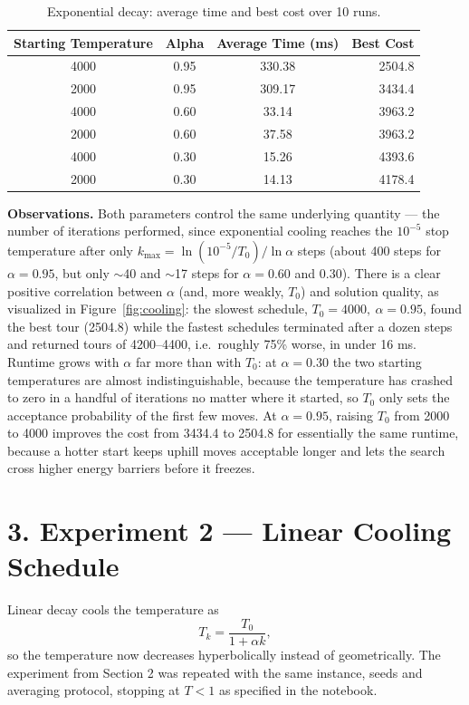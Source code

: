 \documentclass[11pt]{article}
\begin{document}
\begin{table}[h]
\centering
\caption{Exponential decay: average time and best cost over 10 runs.}
\label{tab:exp}
\begin{tabular}{cccr}
\toprule
Starting Temperature & Alpha & Average Time (ms) & Best Cost \\
\midrule
4000 & 0.95 & 330.38  & 2504.8 \\
2000 & 0.95 & 309.17  & 3434.4 \\
4000 & 0.60 & 33.14   & 3963.2 \\
2000 & 0.60 & 37.58   & 3963.2 \\
4000 & 0.30 & 15.26   & 4393.6 \\
2000 & 0.30 & 14.13   & 4178.4 \\
\bottomrule
\end{tabular}
\end{table}

\textbf{Observations.} Both parameters control the same underlying quantity ---
the number of iterations performed, since exponential cooling reaches the
$10^{-5}$ stop temperature after only $k_{\max} = \ln(10^{-5}/T_0)/\ln\alpha$
steps (about 400 steps for $\alpha = 0.95$, but only $\sim$40 and $\sim$17
steps for $\alpha = 0.60$ and $0.30$). There is a clear positive correlation
between $\alpha$ (and, more weakly, $T_0$) and solution quality, as
visualized in Figure~\ref{fig:cooling}: the slowest
schedule, $T_0 = 4000,\ \alpha = 0.95$, found the best tour (2504.8) while the
fastest schedules terminated after a dozen steps and returned tours of
4200--4400, i.e.\ roughly 75\% worse, in under 16 ms. Runtime grows with
$\alpha$ far more than with $T_0$: at $\alpha = 0.30$ the two starting
temperatures are almost indistinguishable, because the temperature has crashed
to zero in a handful of iterations no matter where it started, so $T_0$ only
sets the acceptance probability of the first few moves. At $\alpha = 0.95$,
raising $T_0$ from 2000 to 4000 improves the cost from 3434.4 to 2504.8 for
essentially the same runtime, because a hotter start keeps uphill moves
acceptable longer and lets the search cross higher energy barriers before it
freezes.

\section*{3. Experiment 2 --- Linear Cooling Schedule}

Linear decay cools the temperature as
\begin{equation}
    T_k = \frac{T_0}{1 + \alpha k},
\end{equation}
so the temperature now decreases hyperbolically instead of geometrically. The
experiment from Section 2 was repeated with the same instance, seeds and
averaging protocol, stopping at $T < 1$ as specified in the notebook.
\end{document}
